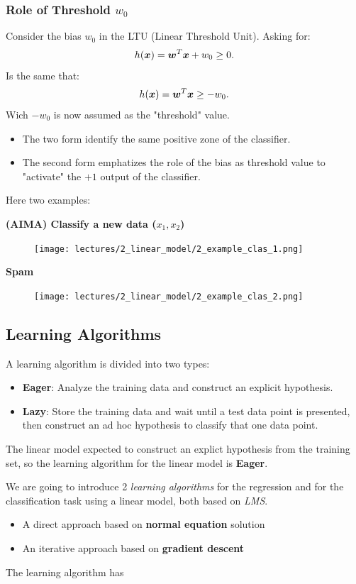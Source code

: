 \documentclass[../main.tex]{subfiles}
\begin{document}
\subsubsection{Role of Threshold $w_0$}%
Consider the bias $w_0$ in the LTU (Linear Threshold Unit). Asking for:
\[
    h(\boldsymbol{x}) = \boldsymbol{w}^T\boldsymbol{x} + w_0 \ge 0
.\] 
Is the same that:
\[
    h(\boldsymbol{x}) = \boldsymbol{w}^T\boldsymbol{x} \ge -w_0
.\] 
Wich $-w_0$ is now assumed as the "threshold" value.
\begin{itemize}
    \item The two form identify the same positive zone of the classifier.
    \item The second form emphatizes the role of the bias as threshold value to "activate" the $+1$ output of the classifier.
\end{itemize}

Here two examples:

\textbf{(AIMA) Classify a new data ($x_1,x_2$)}
\begin{figure}[H]
    \centering
    \texttt{[image: lectures/2\_linear\_model/2\_example\_clas\_1.png]}
\end{figure}

\textbf{Spam}
\begin{figure}[H]
    \centering
    \texttt{[image: lectures/2\_linear\_model/2\_example\_clas\_2.png]}
\end{figure}

\subsection{Learning Algorithms}
A learning algorithm is divided into two types:
\begin{itemize}
    \item \textbf{Eager}: Analyze the training data and construct an explicit hypothesis.
    \item \textbf{Lazy}: Store the training data and wait until a test data point is presented, then construct an ad hoc hypothesis to classify that one data point.
\end{itemize}
The linear model expected to construct an explict hypothesis from the training set, so the learning algorithm for the linear model is \textbf{Eager}.

We are going to introduce 2 \emph{learning algorithms} for the regression and for the classification task using a linear model, both based on \emph{LMS}.
\begin{itemize}
    \item A direct approach based on \textbf{normal equation} solution
    \item An iterative approach based on \textbf{gradient descent}
\end{itemize}
The learning algorithm has 
\end{document}
